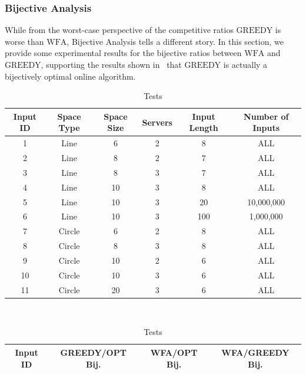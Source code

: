 \subsubsection*{Bijective Analysis}
While from the worst-case perspective of the competitive ratios $\mathrm{GREEDY}$ is worse than $\mathrm{WFA}$, Bijective Analysis tells a different story. In this section, we provide some experimental results for the bijective ratios between $\mathrm{WFA}$ and $\mathrm{GREEDY}$, supporting the results shown in~\cite{bij2016} that $\mathrm{GREEDY}$ is actually a bijectively optimal online algorithm.


\begin{table}[!htb]
    \begin{minipage}{.5\linewidth}
      \centering
      \begin{tabular}{|c|c|c|c|c|c|}
        \hline
        Input ID & Space Type & Space Size & Servers & Input Length & Number of Inputs\\
        \hline
        1 & Line & 6 & 2 & 8 & ALL \\
        \hline
        2 & Line & 8 & 2 & 7 & ALL \\
        \hline
        3 & Line & 8 & 3 & 7 & ALL\\
        \hline
        4 & Line & 10 & 3 & 8 & ALL\\
        \hline
        5 & Line & 10 & 3 & 20 & 10,000,000\\
        \hline
        6 & Line & 10 & 3 & 100 & 1,000,000\\
        \hline 
        7 & Circle & 6 & 2 & 8 & ALL\\
        \hline
        8 & Circle & 8 & 3 & 8 & ALL\\
        \hline
        9 & Circle & 10 & 2 & 6 & ALL\\
        \hline
        10 & Circle & 10 & 3 & 6 & ALL\\
        \hline
        11 & Circle & 20 & 3 & 6 & ALL \\
        \hline
    \end{tabular}
        \caption{Tests}
        \label{tab:tests}
    \end{minipage}%
    \\
    \begin{minipage}{.5\linewidth}
        \centering
        \begin{tabular}{|c|c|c|c|}
          \hline
          Input ID & GREEDY/OPT Bij. & WFA/OPT Bij. & WFA/GREEDY Bij.\\
          \hline

\end{tabular}
\end{minipage}
\end{table}
